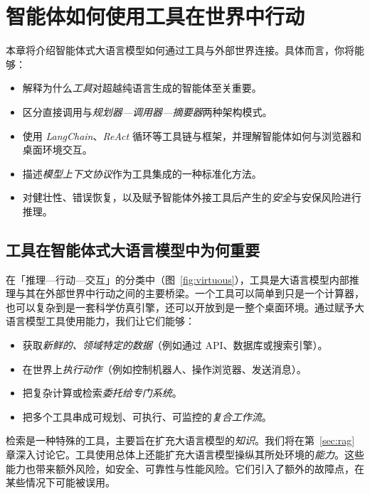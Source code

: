 \chapter{智能体如何使用工具在世界中行动}
\label{sec:tools}\label{chap:tools}

\begin{learningbox}
本章将介绍智能体式大语言模型如何通过工具与外部世界连接。具体而言，你将能够：
\begin{itemize}[leftmargin=*, nosep]
    \item 解释为什么{\em 工具}对超越纯语言生成的智能体至关重要。
    \item 区分直接调用与{\em 规划器—调用器—摘要器}两种架构模式。
    \item 使用 \textit{LangChain}、\textit{ReAct} 循环等工具链与框架，并理解智能体如何与浏览器和桌面环境交互。
    \item 描述\textit{模型上下文协议}作为工具集成的一种标准化方法。
    \item 对健壮性、错误恢复，以及赋予智能体外接工具后产生的{\em 安全}与安保风险进行推理。
\end{itemize}
\end{learningbox}

\section{工具在智能体式大语言模型中为何重要}
在「推理—行动—交互」的分类中（图~\ref{fig:virtuous}），工具是大语言模型内部推理与其在外部世界中行动之间的主要桥梁。一个工具可以简单到只是一个计算器，也可以复杂到是一套科学仿真引擎，还可以开放到是一整个桌面环境。通过赋予大语言模型工具使用能力，我们让它们能够：

\begin{itemize}
    \item 获取\textit{新鲜的、领域特定的数据}（例如通过 API、数据库或搜索引擎）。
    \item 在世界上\textit{执行动作}（例如控制机器人、操作浏览器、发送消息）。
    \item 把复杂计算或检索\textit{委托给专门系统}。
    \item 把多个工具串成可规划、可执行、可监控的\textit{复合工作流}。
\end{itemize}
%
检索是一种特殊的工具，主要旨在扩充大语言模型的\emph{知识}。我们将在第~\ref{sec:rag} 章深入讨论它。工具使用总体上还能扩充大语言模型操纵其所处环境的\emph{能力}。这些能力也带来额外风险，如安全、可靠性与性能风险。它们引入了额外的故障点，在某些情况下可能被误用。




